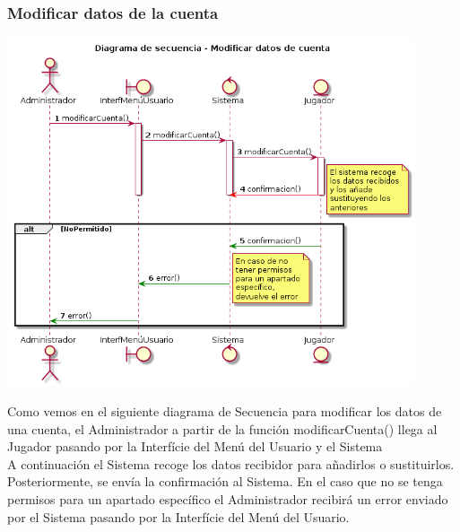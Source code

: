 \subsubsection{Modificar datos de la cuenta}
\begin{center}
  \includegraphics[width=0.9\textwidth]{./imatges/administrador/Modificar_datos_de_cuenta.png}
  \end{center}
  Como vemos en el siguiente diagrama de Secuencia para modificar los datos de una cuenta, el Administrador a partir de la función modificarCuenta() llega al Jugador pasando por la Interfície del Menú del Usuario y el Sistema
  \\A continuación el Sistema recoge los datos recibidor para añadirlos o sustituirlos. Posteriormente, se envía la confirmación al Sistema. En el caso que no se tenga permisos para un apartado específico el Administrador recibirá un error enviado por el Sistema pasando por la Interfície del Menú del Usuario.
  
